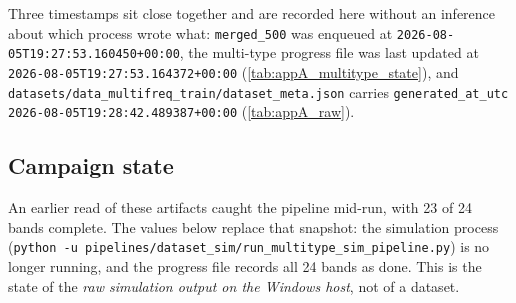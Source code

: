 Three timestamps sit close together and are recorded here without an inference about which process
wrote what: \texttt{merged\_500} was enqueued at \texttt{2026-08-05T19:27:53.160450+00:00}, the
multi-type progress file was last updated at \texttt{2026-08-05T19:27:53.164372+00:00}
(\autoref{tab:appA_multitype_state}), and
\texttt{datasets/\allowbreak{}data\_\allowbreak{}multifreq\_\allowbreak{}train/\allowbreak{}dataset\_\allowbreak{}meta.json} carries \texttt{generated\_at\_utc}
\texttt{2026-08-05T19:28:42.489387+00:00} (\autoref{tab:appA_raw}).

\subsection{Campaign state}
\label{subsec:appA_multitype_state}

An earlier read of these artifacts caught the pipeline mid-run, with 23 of 24 bands complete. The
values below replace that snapshot: the simulation process
(\texttt{python -u pipelines/\allowbreak{}dataset\_\allowbreak{}sim/\allowbreak{}run\_\allowbreak{}multitype\_\allowbreak{}sim\_\allowbreak{}pipeline.py}) is no longer running,
and the progress file records all 24 bands as done. This is the state of the \emph{raw simulation
output on the Windows host}, not of a dataset.


